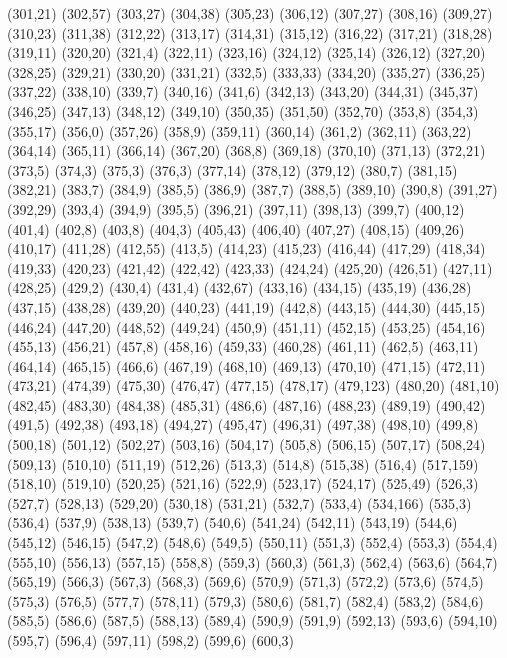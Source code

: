 {(301,21)
(302,57)
(303,27)
(304,38)
(305,23)
(306,12)
(307,27)
(308,16)
(309,27)
(310,23)
(311,38)
(312,22)
(313,17)
(314,31)
(315,12)
(316,22)
(317,21)
(318,28)
(319,11)
(320,20)
(321,4)
(322,11)
(323,16)
(324,12)
(325,14)
(326,12)
(327,20)
(328,25)
(329,21)
(330,20)
(331,21)
(332,5)
(333,33)
(334,20)
(335,27)
(336,25)
(337,22)
(338,10)
(339,7)
(340,16)
(341,6)
(342,13)
(343,20)
(344,31)
(345,37)
(346,25)
(347,13)
(348,12)
(349,10)
(350,35)
(351,50)
(352,70)
(353,8)
(354,3)
(355,17)
(356,0)
(357,26)
(358,9)
(359,11)
(360,14)
(361,2)
(362,11)
(363,22)
(364,14)
(365,11)
(366,14)
(367,20)
(368,8)
(369,18)
(370,10)
(371,13)
(372,21)
(373,5)
(374,3)
(375,3)
(376,3)
(377,14)
(378,12)
(379,12)
(380,7)
(381,15)
(382,21)
(383,7)
(384,9)
(385,5)
(386,9)
(387,7)
(388,5)
(389,10)
(390,8)
(391,27)
(392,29)
(393,4)
(394,9)
(395,5)
(396,21)
(397,11)
(398,13)
(399,7)
(400,12)
(401,4)
(402,8)
(403,8)
(404,3)
(405,43)
(406,40)
(407,27)
(408,15)
(409,26)
(410,17)
(411,28)
(412,55)
(413,5)
(414,23)
(415,23)
(416,44)
(417,29)
(418,34)
(419,33)
(420,23)
(421,42)
(422,42)
(423,33)
(424,24)
(425,20)
(426,51)
(427,11)
(428,25)
(429,2)
(430,4)
(431,4)
(432,67)
(433,16)
(434,15)
(435,19)
(436,28)
(437,15)
(438,28)
(439,20)
(440,23)
(441,19)
(442,8)
(443,15)
(444,30)
(445,15)
(446,24)
(447,20)
(448,52)
(449,24)
(450,9)
(451,11)
(452,15)
(453,25)
(454,16)
(455,13)
(456,21)
(457,8)
(458,16)
(459,33)
(460,28)
(461,11)
(462,5)
(463,11)
(464,14)
(465,15)
(466,6)
(467,19)
(468,10)
(469,13)
(470,10)
(471,15)
(472,11)
(473,21)
(474,39)
(475,30)
(476,47)
(477,15)
(478,17)
(479,123)
(480,20)
(481,10)
(482,45)
(483,30)
(484,38)
(485,31)
(486,6)
(487,16)
(488,23)
(489,19)
(490,42)
(491,5)
(492,38)
(493,18)
(494,27)
(495,47)
(496,31)
(497,38)
(498,10)
(499,8)
(500,18)
(501,12)
(502,27)
(503,16)
(504,17)
(505,8)
(506,15)
(507,17)
(508,24)
(509,13)
(510,10)
(511,19)
(512,26)
(513,3)
(514,8)
(515,38)
(516,4)
(517,159)
(518,10)
(519,10)
(520,25)
(521,16)
(522,9)
(523,17)
(524,17)
(525,49)
(526,3)
(527,7)
(528,13)
(529,20)
(530,18)
(531,21)
(532,7)
(533,4)
(534,166)
(535,3)
(536,4)
(537,9)
(538,13)
(539,7)
(540,6)
(541,24)
(542,11)
(543,19)
(544,6)
(545,12)
(546,15)
(547,2)
(548,6)
(549,5)
(550,11)
(551,3)
(552,4)
(553,3)
(554,4)
(555,10)
(556,13)
(557,15)
(558,8)
(559,3)
(560,3)
(561,3)
(562,4)
(563,6)
(564,7)
(565,19)
(566,3)
(567,3)
(568,3)
(569,6)
(570,9)
(571,3)
(572,2)
(573,6)
(574,5)
(575,3)
(576,5)
(577,7)
(578,11)
(579,3)
(580,6)
(581,7)
(582,4)
(583,2)
(584,6)
(585,5)
(586,6)
(587,5)
(588,13)
(589,4)
(590,9)
(591,9)
(592,13)
(593,6)
(594,10)
(595,7)
(596,4)
(597,11)
(598,2)
(599,6)
(600,3)
}
